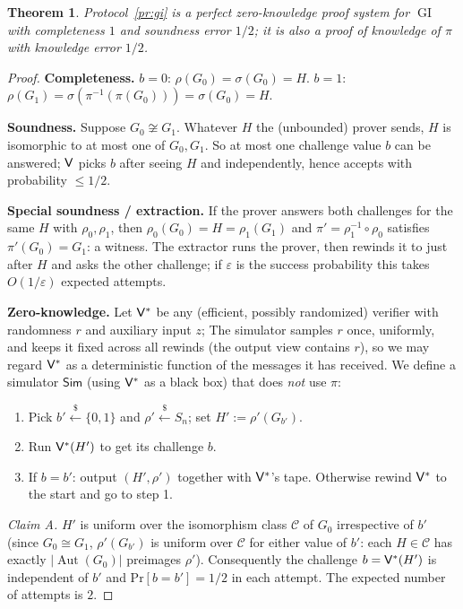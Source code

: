\documentclass[11pt,a4paper]{report}
\theoremstyle{plain}
\newtheorem{theorem}{Theorem}[chapter]
\theoremstyle{definition}
\theoremstyle{remark}
\newcommand{\getsr}{\xleftarrow{\$}}
\renewcommand{\Pr}{\mathrm{Pr}}
\newcommand{\Sim}{\mathsf{Sim}}\newcommand{\Ext}{\mathsf{Ext}}
\newcommand{\inv}{^{-1}}
\DeclareMathOperator{\GI}{GI}\DeclareMathOperator{\GNI}{GNI}
\DeclareMathOperator{\Aut}{Aut}
\begin{document}
\begin{theorem}\label{thm:gi}
Protocol~\ref{pr:gi} is a perfect zero-knowledge proof system for $\GI$ with completeness $1$ and soundness error $1/2$; it is also a proof of knowledge of $\pi$ with knowledge error $1/2$.
\end{theorem}
\begin{proof}
\textbf{Completeness.} $b=0$: $\rho(G_0)=\sigma(G_0)=H$. $b=1$: $\rho(G_1)=\sigma(\pi\inv(\pi(G_0)))=\sigma(G_0)=H$.

\textbf{Soundness.} Suppose $G_0\not\cong G_1$. Whatever $H$ the (unbounded) prover sends, $H$ is isomorphic to at most one of $G_0,G_1$. So at most one challenge value $b$ can be answered; $\mathsf{V}$ picks $b$ after seeing $H$ and independently, hence accepts with probability $\le1/2$.

\textbf{Special soundness / extraction.} If the prover answers both challenges for the same $H$ with $\rho_0,\rho_1$, then $\rho_0(G_0)=H=\rho_1(G_1)$ and $\pi'=\rho_1\inv\circ\rho_0$ satisfies $\pi'(G_0)=G_1$: a witness. The extractor runs the prover, then rewinds it to just after $H$ and asks the other challenge; if $\varepsilon$ is the success probability this takes $O(1/\varepsilon)$ expected attempts.

\textbf{Zero-knowledge.} Let $\mathsf{V}^*$ be any (efficient, possibly randomized) verifier with randomness $r$ and auxiliary input $z$; The simulator samples $r$ once, uniformly, and keeps it fixed across all rewinds (the output view contains $r$), so we may regard $\mathsf{V}^*$ as a deterministic function of the messages it has received. We define a simulator $\Sim$ (using $\mathsf{V}^*$ as a black box) that does \emph{not} use $\pi$:
\begin{enumerate}
\item Pick $b'\getsr\{0,1\}$ and $\rho'\getsr S_n$; set $H':=\rho'(G_{b'})$.
\item Run $\mathsf{V}^*(H')$ to get its challenge $b$.
\item If $b=b'$: output $(H',\rho')$ together with $\mathsf{V}^*$'s tape. Otherwise rewind $\mathsf{V}^*$ to the start and go to step 1.
\end{enumerate}
\emph{Claim A.} $H'$ is uniform over the isomorphism class $\mathcal{C}$ of $G_0$ irrespective of $b'$ (since $G_0\cong G_1$, $\rho'(G_{b'})$ is uniform over $\mathcal C$ for either value of $b'$: each $H\in\mathcal C$ has exactly $|\Aut(G_0)|$ preimages $\rho'$). Consequently the challenge $b=\mathsf{V}^*(H')$ is independent of $b'$ and $\Pr[b=b']=1/2$ in each attempt. The expected number of attempts is $2$.


\end{proof}
\end{document}
